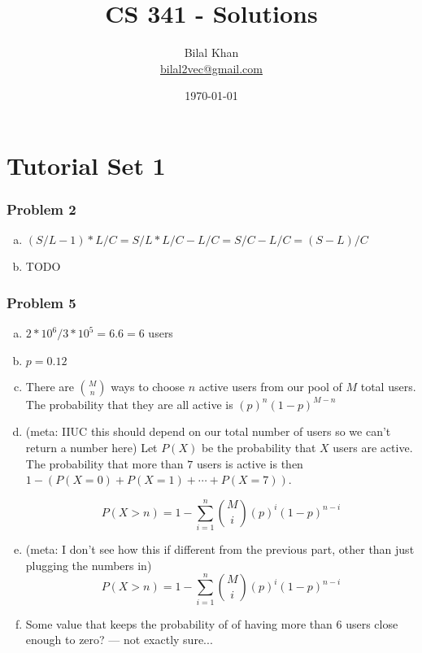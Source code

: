 \documentclass[11pt]{article}
\title{CS 341 - Solutions}
\author{Bilal Khan\\
\href{mailto:bilal2vec@gmail.com}{bilal2vec@gmail.com}}
\date{\today}
\begin{document}
\maketitle

\tableofcontents

\section{Tutorial Set 1}

\subsubsection{Problem 2}

\begin{enumerate}[(a)]
    \item $(S/L-1) * L/C = S/L * L/C - L/C = S/C - L/C = (S - L) / C$
    \item TODO
\end{enumerate}

\subsubsection{Problem 5}

\begin{enumerate}[(a)]
    \item $2*10^6 / 3*10^5 = 6.6 = 6$ users
    \item $p = 0.12$
    \item There are $M \choose n$ ways to choose $n$ active users from our pool of $M$ total users. The probability that they are all active is $(p)^n(1-p)^{M-n}$
    \item (meta: IIUC this should depend on our total number of users so we can't return a number here) Let $P(X)$ be the probability that $X$ users are active. The probability that more than $7$ users is active is then $1 - (P(X=0) + P(X=1) + \cdots + P(X=7))$. 
    
    
    \[ P(X > n) = 1 - \sum_{i=1}^{n} {M \choose i} (p)^{i} (1-p)^{n-i} \]
    \item (meta: I don't see how this if different from the previous part, other than just plugging the numbers in)
    \[ P(X > n) = 1 - \sum_{i=1}^{n} {M \choose i} (p)^{i} (1-p)^{n-i} \]

    \item Some value that keeps the probability of of having more than 6 users close enough to zero? — not exactly sure...
\end{enumerate}
\end{document}
